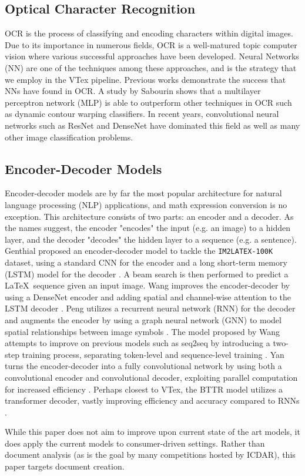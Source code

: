 
\subsection{Optical Character Recognition}

OCR is the process of classifying and encoding characters within digital images. Due to its importance in numerous fields, OCR is a well-matured topic computer vision where various successful approaches have been developed. Neural Networks (NN) are one of the techniques among these approaches, and is the strategy that we employ in the VTex pipeline. Previous works demonstrate the success that NNs have found in OCR. A study by Sabourin \cite{SABOURIN1992843} shows that a multilayer perceptron network (MLP) is able to outperform other techniques in OCR such as dynamic contour warping classifiers. In recent years, convolutional neural networks such as ResNet \cite{Resnet2016} and DenseNet \cite{Densenet2017} have dominated this field as well as many other image classification problems.

\subsection{Encoder-Decoder Models}

Encoder-decoder models are by far the most popular architecture for natural language processing (NLP) applications, and math expression conversion is no exception. This architecture consists of two parts: an encoder and a decoder. As the names suggest, the encoder "encodes" the input (e.g. an image) to a hidden layer, and the decoder "decodes" the hidden layer to a sequence (e.g. a sentence). Genthial proposed an encoder-decoder model to tackle the {\tt IM2LATEX-100K} dataset, using a standard CNN for the encoder and a long short-term memory (LSTM) model for the decoder \cite{Genthial2016}. A beam search is then performed to predict a \LaTeX\ sequence given an input image. Wang improves the encoder-decoder by using a DenseNet encoder and adding spatial and channel-wise attention to the LSTM decoder \cite{Wang2019}. Peng utilizes a recurrent neural network (RNN) for the decoder and augments the encoder by using a graph neural network (GNN) to model spatial relationships between image symbols \cite{Peng2021}. The model proposed by Wang attempts to improve on previous models such as seq2seq by introducing a two-step training process, separating token-level and sequence-level training \cite{Wang2021}. Yan turns the encoder-decoder into a fully convolutional network by using both a convolutional encoder and convolutional decoder, exploiting parallel computation for increased efficiency \cite{ConvMath2021}. Perhaps closest to VTex, the BTTR model utilizes a transformer decoder, vastly improving efficiency and accuracy compared to RNNs \cite{ZhaoBTTR2021}.

While this paper does not aim to improve upon current state of the art models, it does apply the current models to consumer-driven settings. Rather than document analysis (as is the goal by many competitions hosted by ICDAR), this paper targets document creation.




